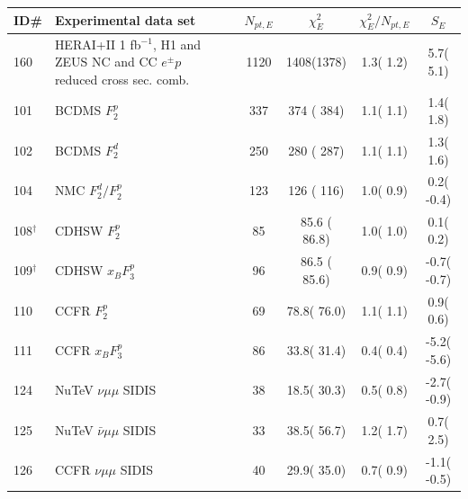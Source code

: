 \begin{widetext}

\begingroup
\squeezetable
\begin{table}[htbp]
\begin{tabular}{|l|lr|c|c|c|c|}
\hline
\textbf{ID\# }  & \textbf{Experimental data set} &  & $N_{pt, E}$  & $\chi^2_E$ & $\chi^{2}_E/N_{pt, E}$  & $S_E$ \tabularnewline
\hline
\hline
%
 160 & HERAI+II 1 fb$^{-1}$, H1 and ZEUS NC and CC $e^\pm p$ reduced cross sec. comb.      & \cite{Abramowicz:2015mha}   & 1120  &  1408(1378) &   1.3( 1.2) &   5.7(  5.1)   \tabularnewline\hline
 101 & BCDMS $F_{2}^{p}$                                                                   & \cite{Benvenuti:1989rh}     &  337  &   374 ( 384) &   1.1( 1.1) &   1.4(  1.8)   \tabularnewline\hline
 102 & BCDMS $F_{2}^{d}$                                                                   & \cite{Benvenuti:1989fm}     &  250  &   280 ( 287) &   1.1( 1.1) &   1.3(  1.6)   \tabularnewline\hline
 104 & NMC $F_{2}^{d}/F_{2}^{p}$                                                           & \cite{Arneodo:1996qe}       &  123  &   126 ( 116) &   1.0( 0.9) &   0.2( -0.4)   \tabularnewline\hline
 108$^{\dagger}$ & CDHSW $F_{2}^{p}$                                                       & \cite{Berge:1989hr}         &   85  &    85.6 ( 86.8) &   1.0( 1.0) &   0.1(  0.2)   \tabularnewline\hline         
 109$^{\dagger}$ & CDHSW $x_B F_{3}^{p}$                                                       & \cite{Berge:1989hr}         &   96  &    86.5 (  85.6) &   0.9( 0.9) &  -0.7( -0.7)   \tabularnewline\hline
 110 & CCFR $F_{2}^{p}$                                                                    & \cite{Yang:2000ju}          &   69  &    78.8(  76.0) &   1.1( 1.1) &   0.9(  0.6)   \tabularnewline\hline
 111 & CCFR $x_B F_{3}^{p}$                                                                   & \cite{Seligman:1997mc}      &   86  &    33.8(  31.4) &   0.4( 0.4) &  -5.2( -5.6)   \tabularnewline\hline
 124 & NuTeV $\nu\mu\mu$ SIDIS                                                             & \cite{Mason:2006qa}         &   38  &    18.5(  30.3) &   0.5( 0.8) &  -2.7( -0.9)   \tabularnewline\hline
 125 & NuTeV $\bar\nu \mu\mu$ SIDIS                                                        & \cite{Mason:2006qa}         &   33  &    38.5(  56.7) &   1.2( 1.7) &   0.7(  2.5)   \tabularnewline\hline
 126 & CCFR $\nu\mu\mu$ SIDIS                                                              & \cite{Goncharov:2001qe}     &   40  &    29.9(  35.0) &   0.7( 0.9) &  -1.1( -0.5)   \tabularnewline\hline

\end{tabular}
\end{table}
\end{widetext}
